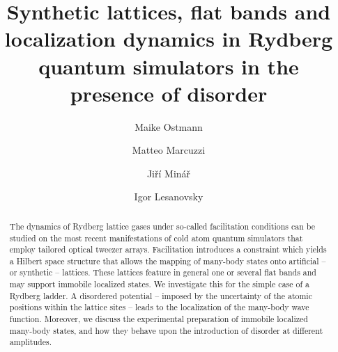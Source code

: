 \documentclass[prl,aps,twocolumn,showpacs,superscriptaddress,longbibliography]{revtex4-1}
\begin{document}
\title{{\color{red} Synthetic lattices, flat bands and localization dynamics in Rydberg quantum simulators in the presence of disorder}}

\author{Maike Ostmann}
\author{Matteo Marcuzzi}
\author{Ji\v{r}\'{i} Min\'{a}\v{r}}
\author{Igor Lesanovsky}



\begin{abstract}
The dynamics of Rydberg lattice gases under so-called facilitation conditions can be studied on the most recent manifestations of cold atom quantum simulators that employ tailored optical tweezer arrays. Facilitation introduces a constraint which yields a Hilbert space structure that allows the mapping of many-body states onto artificial -- or synthetic -- lattices. These lattices feature in general one or several flat bands and may support immobile localized states. We investigate this for the simple case of a Rydberg ladder. A disordered potential --  imposed by the uncertainty of the atomic positions within the lattice sites -- leads to the localization of the many-body wave function. Moreover, we discuss the experimental preparation of immobile localized many-body states, and how they behave upon the introduction of disorder at different amplitudes.
\end{abstract}
\pacs{}
\maketitle
\end{document}
